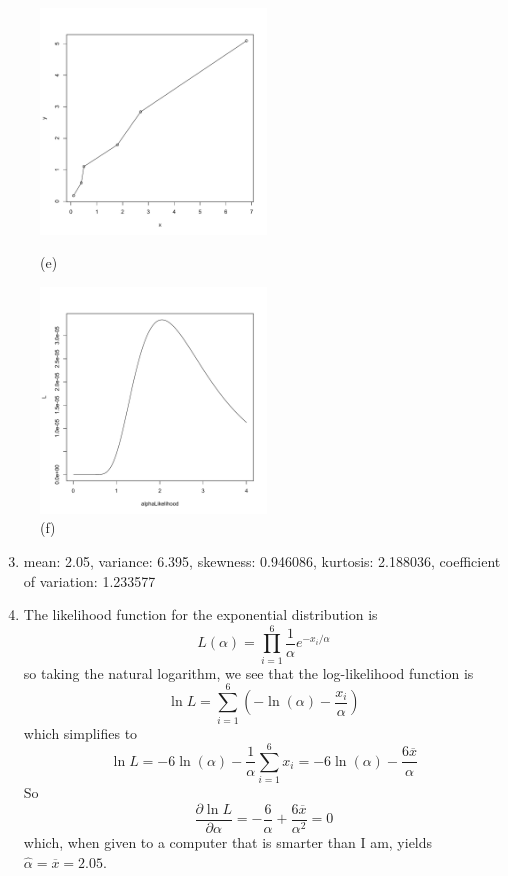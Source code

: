 \documentclass[11pt]{article} %
\begin{document}
\begin{enumerate}
\begin{figure}[ht]
\begin{minipage}[b]{0.45\linewidth}
\centering
\includegraphics[width=6cm]{asm3e.pdf}
\caption{(e)}
\label{fig:figure1}
\end{minipage}
\hspace{0.5cm}
\begin{minipage}[b]{0.45\linewidth}
\centering
\includegraphics[width=6cm]{asm3f.pdf}
\caption{(f)}
\label{fig:figure2}
\end{minipage}
\end{figure}

\begin{enumerate}

\setcounter{enumii}{2}
\item mean: 2.05, variance: 6.395, skewness: 0.946086, kurtosis: 2.188036, coefficient of variation: 1.233577 

\item The likelihood function for the exponential distribution is 
$$L(\alpha) = \prod_{i=1}^6 \frac{1}{\alpha}e^{-x_i/\alpha}$$ 
so taking the natural logarithm, we see that the log-likelihood function is 
$$\ln L = \sum_{i=1}^6\left(-\ln(\alpha)-\frac{x_i}{\alpha}\right)$$
which simplifies to 
$$\ln L = -6\ln(\alpha) - \frac{1}{\alpha}\sum_{i=1}^6 x_i = -6\ln(\alpha) - \frac{6\overline{x}}{\alpha}$$ 
So
$$\frac{\partial \ln L}{\partial \alpha} = -\frac{6}{\alpha} + \frac{6\overline{x}}{\alpha^2}=0$$
which, when given to a computer that is smarter than I am, yields $\hat{\alpha} = \overline{x} = 2.05$.


\end{enumerate}
\end{enumerate}
\end{document}
